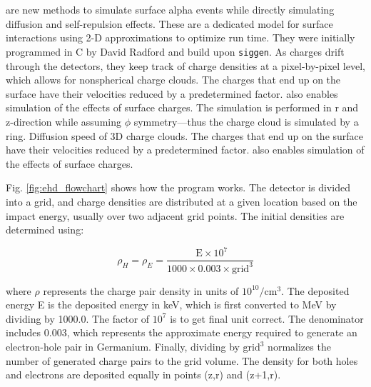 

\section{{\tdsim}}
{\tdsim} are new methods to simulate surface alpha events while directly simulating diffusion and self-repulsion effects. These are a dedicated model for surface interactions using 2-D approximations to optimize run time. They were initially programmed in C by David Radford and build upon \texttt{siggen}. As charges drift through the detectors, they keep track of charge densities at a pixel-by-pixel level, which allows for nonspherical charge clouds. The charges that end up on the surface have their velocities reduced by a predetermined factor. {\tdsim} also enables simulation of the effects of surface charges. The simulation is performed in r and z-direction while assuming $\phi$ symmetry—thus the charge cloud is simulated by a ring. Diffusion speed of 3D charge clouds. The charges that end up on the surface have their velocities reduced by a predetermined factor. {\tdsim} also enables simulation of the effects of surface charges.


Fig. \ref{fig:ehd_flowchart} shows how the {\tdsim} program works. The detector is divided into a grid, and charge densities are distributed at a given location based on the impact energy, usually over two adjacent grid points. The initial densities are determined using:

\begin{equation}
    \rho_H = \rho_E= \frac{\text{ E}\times 10^7 }{1000 \times 0.003 \times \text{grid}^3}
\end{equation}

where $\rho$ represents the charge pair density in units of \(10^{10}/\text{cm}^3\). The deposited energy E is the deposited energy in keV, which is first converted to MeV by dividing by 1000.0. The factor of \(10^7\) is to get final unit correct. The denominator includes \(0.003\), which represents the approximate energy required to generate an electron-hole pair in Germanium. Finally, dividing by \(\text{grid}^3\) normalizes the number of generated charge pairs to the grid volume. The density for both holes and electrons are deposited equally in points (z,r) and (z+1,r).

